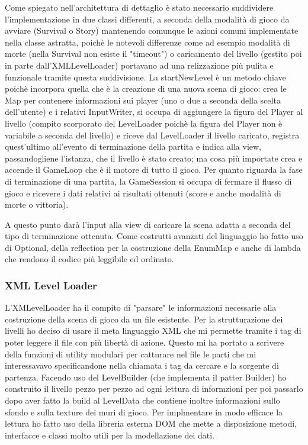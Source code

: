 \documentclass[a4paper,12pt]{report}
\begin{document}
Come spiegato nell'architettura di dettaglio è stato necessario suddividere l'implementazione in due classi differenti, a seconda della modalità di gioco da avviare (Survival o Story) mantenendo comunque le azioni comuni implementate nella classe astratta, poichè le notevoli differenze come ad esempio modalità di morte (nella Survival non esiste il "timeout") o caricamento del livello (gestito poi in parte dall'XMLLevelLoader) portavano ad una relizzazione più pulita e funzionale tramite questa suddivisione.
La startNewLevel è un metodo chiave poichè incorpora quella che è la creazione di una nuova scena di gioco: crea le Map per contenere informazioni sui player (uno o due a seconda della scelta dell'utente) e i relativi InputWriter, si occupa di aggiungere la figura del Player al livello (compito scorporato del LevelLoader poichè la figura del Player non è variabile a seconda del livello) e riceve dal LevelLoader il livello caricato, registra quest'ultimo all'evento di terminazione della partita e indica alla view, passandogliene l'istanza, che il livello è stato creato; ma cosa più importate crea e accende il GameLoop che è il motore di tutto il gioco.
Per quanto riguarda la fase di terminazione di una partita, la GameSession si occupa di fermare il flusso di gioco e ricevere i dati relativi ai risultati ottenuti (score e anche modalità di morte o vittoria).

A questo punto darà l'input alla view di caricare la scena adatta a seconda del tipo di terminazione ottenuta.
Come costrutti avanzati del linguaggio ho fatto uso di Optional, della reflection per la costruzione della EnumMap e anche di lambda che rendono il codice più leggibile ed ordinato.

\subsubsection*{XML Level Loader}
L'XMLevelLoader ha il compito di "parsare" le informazioni necessarie alla costruzione della scena di gioco da un file esistente.
Per la strutturazione dei livelli ho deciso di usare il meta linguaggio XML che mi permette tramite i tag di poter leggere il file con più libertà di azione.
Questo mi ha portato a scrivere della funzioni di utility modulari per catturare nel file le parti che mi interessavavo specificandone nella chiamata i tag da cercare e la sorgente di partenza.
Facendo uso del LevelBuilder (che implementa il patter Builder) ho construito il livello pezzo per pezzo ad ogni lettura di informzioni per poi passarlo dopo aver fatto la build al LevelData che contiene inoltre informazioni sullo sfondo e sulla texture dei muri di gioco.
Per implmentare in modo efficace la lettura ho fatto uso della libreria esterna DOM che mette a disposizione metodi, interfacce e classi molto utili per la modellazione dei dati.
\end{document}
